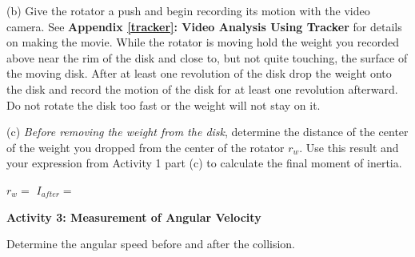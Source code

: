(b) Give the rotator a push and begin recording its motion with the video camera. See \textbf{Appendix \ref{tracker}: Video Analysis Using Tracker} for details on making the movie. 
While the rotator is moving hold the weight you recorded above near the rim of the disk and 
close to, but not quite touching, the surface of the moving disk. After at least one revolution
of the disk drop the weight onto the disk and record the motion of the disk for at least one 
revolution afterward. Do not rotate the disk too fast or the weight will not stay on it.

(c) \textit{Before removing the weight from the disk}, determine the distance of the center of the weight you dropped from the center of the rotator $r_w$. 
Use this result and your expression from Activity 1 part (c) to calculate the final moment of inertia.
\answerspace{5mm}

$r_w=$ \hfill{} $I_{after} =$ \hfill{}  
\answerspace{5mm}


\textbf{Activity 3: Measurement of Angular Velocity}

Determine the angular speed before and after the collision.

